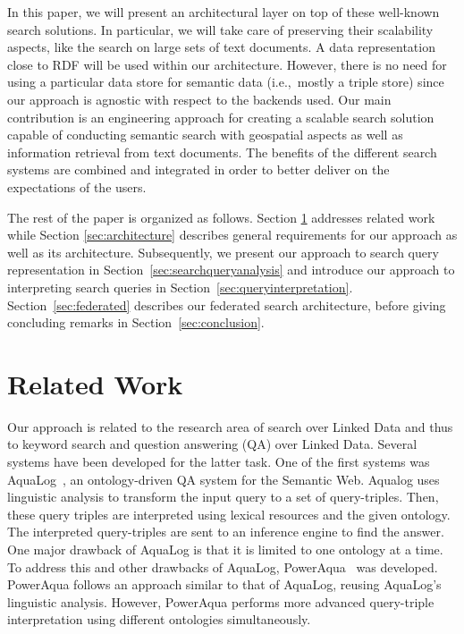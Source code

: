 \documentclass{acm_proc_article-sp}
\newcommand{\ie}{i.e.,~}
\begin{document}

In this paper, we will present an architectural layer on top of these well-known search solutions.
In particular, we will take care of preserving their scalability aspects, like the search on large sets of text documents.
A data representation close to RDF will be used within our architecture. 
However, there is no need for using a particular data store for semantic data (\ie mostly a triple store) since our approach is agnostic with respect to the backends used. %
Our main contribution is an engineering approach for creating a scalable search solution capable of conducting semantic search with geospatial aspects as well as information retrieval from text documents. The benefits of the different search systems are combined and integrated in order to better deliver on the expectations of the users. 
 
The rest of the paper is organized as follows. Section \ref{sec:related} addresses related work while Section \ref{sec:architecture} describes general requirements for our approach as well as its architecture.
Subsequently, we present our approach to search query representation in Section~\ref{sec:searchqueryanalysis} and introduce our approach to interpreting search queries in Section~\ref{sec:queryinterpretation}.
Section~\ref{sec:federated} describes our federated search architecture, before giving concluding remarks in Section~\ref{sec:conclusion}.


\section{Related Work}
\label{sec:related}
Our approach is related to the research area of search over Linked Data and thus to keyword search and question answering (QA) over Linked Data.
Several systems have been developed for the latter task.
One of the first systems was AquaLog~\cite{aqualog}, an ontology-driven QA system for the Semantic Web. 
Aqualog uses linguistic analysis to transform the input query to a set of query-triples. 
Then, these query triples are interpreted using lexical resources and the given ontology. 
The interpreted query-triples are sent to an inference engine to find the answer.
One major drawback of AquaLog is that it is limited to one ontology at a time.
To address this and other drawbacks of AquaLog, PowerAqua~\cite{poweraqua} was developed.
PowerAqua follows an approach similar to that of AquaLog, reusing AquaLog's linguistic analysis.
However, PowerAqua performs more advanced query-triple interpretation using different ontologies simultaneously.
\end{document}
